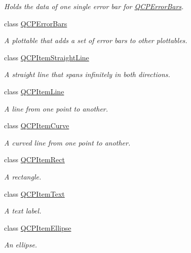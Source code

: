 \begin{DoxyCompactItemize}
\begin{DoxyCompactList}\small\item\em Holds the data of one single error bar for \hyperlink{class_q_c_p_error_bars}{Q\+C\+P\+Error\+Bars}. \end{DoxyCompactList}\item 
class \hyperlink{class_q_c_p_error_bars}{Q\+C\+P\+Error\+Bars}
\begin{DoxyCompactList}\small\item\em A plottable that adds a set of error bars to other plottables. \end{DoxyCompactList}\item 
class \hyperlink{class_q_c_p_item_straight_line}{Q\+C\+P\+Item\+Straight\+Line}
\begin{DoxyCompactList}\small\item\em A straight line that spans infinitely in both directions. \end{DoxyCompactList}\item 
class \hyperlink{class_q_c_p_item_line}{Q\+C\+P\+Item\+Line}
\begin{DoxyCompactList}\small\item\em A line from one point to another. \end{DoxyCompactList}\item 
class \hyperlink{class_q_c_p_item_curve}{Q\+C\+P\+Item\+Curve}
\begin{DoxyCompactList}\small\item\em A curved line from one point to another. \end{DoxyCompactList}\item 
class \hyperlink{class_q_c_p_item_rect}{Q\+C\+P\+Item\+Rect}
\begin{DoxyCompactList}\small\item\em A rectangle. \end{DoxyCompactList}\item 
class \hyperlink{class_q_c_p_item_text}{Q\+C\+P\+Item\+Text}
\begin{DoxyCompactList}\small\item\em A text label. \end{DoxyCompactList}\item 
class \hyperlink{class_q_c_p_item_ellipse}{Q\+C\+P\+Item\+Ellipse}
\begin{DoxyCompactList}\small\item\em An ellipse. \end{DoxyCompactList}\item 

\end{DoxyCompactItemize}
